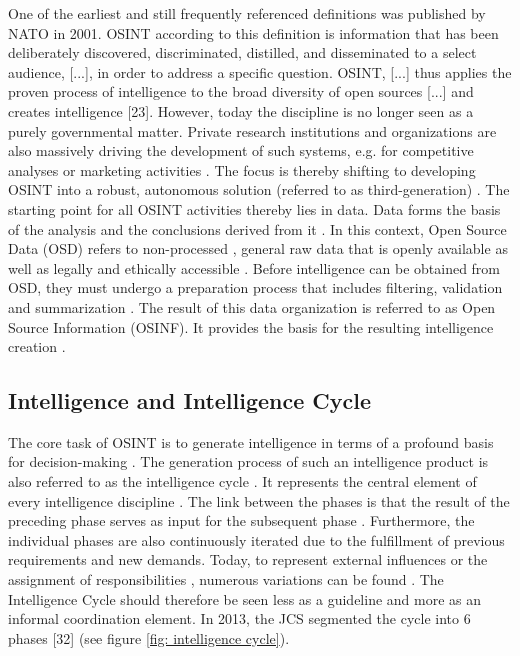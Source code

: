 \documentclass[10pt]{article}
\begin{document}
One of the earliest and still frequently referenced definitions \cite{DosPassos.2017}
was published by NATO in 2001. OSINT according to this definition is information that has been
deliberately discovered, discriminated, distilled, and disseminated to a select audience,
[...], in order to address a specific question. OSINT, [...] thus applies the proven
process of intelligence to the broad diversity of open sources [...] and creates
intelligence [23]. However, today the discipline is no longer seen as a purely governmental
matter. Private research institutions and organizations \cite{Bohm.2021,Mercado.2005} are
also massively driving the development of such systems, e.g. for competitive analyses or marketing activities
\cite{AlKilani.2021, Dokman.2020,Ghioni.2023}. The focus is thereby shifting to
developing OSINT into a robust, autonomous solution (referred to as third-generation) \cite{Billings.1997,PastorGalindo.2019,Schaurer.2010}.
The starting point for all OSINT activities thereby lies in data. Data forms the basis of the
analysis and the conclusions derived from it \cite{Gibson.2016}. In this context, Open Source Data (OSD)
refers to non-processed \cite{DosPassos.2017}, general raw data that is openly available
\cite{Burke.2007} as well as legally and ethically accessible
\cite{Schaurer.2010, NorthAtlanticTreatyOrganization.2001}. Before intelligence can be obtained
from OSD, they must undergo a preparation process that includes filtering, validation and
summarization \cite{DosPassos.2017, NorthAtlanticTreatyOrganization.2001}. The result of this
data organization \cite{Schaurer.2010} is referred to as Open Source Information (OSINF). It provides the basis for the
resulting intelligence creation \cite{DosPassos.2017,Schaurer.2010}.


\subsection{Intelligence and Intelligence Cycle}

The core task of OSINT is to generate intelligence \cite{Hwang.2022,Dokman.2020}
in terms of a profound basis for decision-making
\cite{Breakspear.2013,May.2020}. The generation process of such an intelligence product
is also referred to as the intelligence cycle \cite{HerreraCubides.2020, CentralIntelligenceAgency.1987}.
It represents the central element of every intelligence discipline \cite{Reuser.2017,Dokman.2020}. The link between the phases is that
the result of the preceding phase serves as input for the subsequent phase
\cite{JointChiefsofStaffU.S.Army.2013,Pellissier.2013}. Furthermore, the individual phases are also continuously
iterated due to the fulfillment of previous requirements and new demands\cite{Gibson.2016}.
Today, to represent external influences or the
assignment of responsibilities \cite{Lowenthal.2020,Phythian.2013,Johnston.2005}, numerous
variations can be found \cite{Bohm.2021,Reuser.2017}. The
Intelligence Cycle should therefore be seen less as a guideline and more as an informal
coordination element\cite{Hwang.2022}.
In 2013, the JCS segmented the cycle into 6 phases [32] (see figure \ref{fig: intelligence cycle}).
\end{document}

